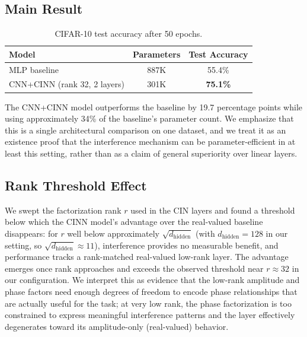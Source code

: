 \documentclass[11pt]{article}
\begin{document}
\subsection{Main Result}
\begin{table}[h]
\centering
\caption{CIFAR-10 test accuracy after 50 epochs.}
\label{tab:main}
\begin{tabular}{lcc}
\toprule
Model & Parameters & Test Accuracy \\
\midrule
MLP baseline & 887K & 55.4\% \\
CNN+CINN (rank 32, 2 layers) & 301K & \textbf{75.1\%} \\
\bottomrule
\end{tabular}
\end{table}

The CNN+CINN model outperforms the baseline by 19.7 percentage points while using approximately 34\% of the baseline's parameter count. We emphasize that this is a single architectural comparison on one dataset, and we treat it as an existence proof that the interference mechanism can be parameter-efficient in at least this setting, rather than as a claim of general superiority over linear layers.

\subsection{Rank Threshold Effect}
We swept the factorization rank $r$ used in the CIN layers and found a threshold below which the CINN model's advantage over the real-valued baseline disappears: for $r$ well below approximately $\sqrt{d_{\text{hidden}}}$ (with $d_{\text{hidden}} = 128$ in our setting, so $\sqrt{d_{\text{hidden}}} \approx 11$), interference provides no measurable benefit, and performance tracks a rank-matched real-valued low-rank layer. The advantage emerges once rank approaches and exceeds the observed threshold near $r \approx 32$ in our configuration. We interpret this as evidence that the low-rank amplitude and phase factors need enough degrees of freedom to encode phase relationships that are actually useful for the task; at very low rank, the phase factorization is too constrained to express meaningful interference patterns and the layer effectively degenerates toward its amplitude-only (real-valued) behavior.
\end{document}

